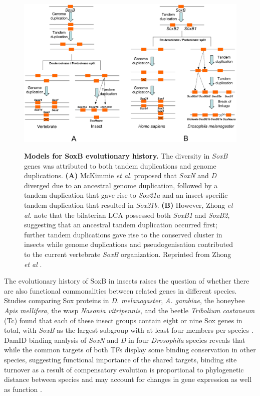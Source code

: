 \documentclass[withindex,glossary]{cam-thesis}
\begin{document}
\setcounter{figure}{3-1}
\begin{figure}[htb]
\centering
\includegraphics[width=\textwidth]{figs/Figure 3 Zhong vs McKimmie.png}
\label{fig3}
\caption{\textbf{Models for SoxB evolutionary history.} The diversity in \emph{SoxB} genes was attributed to both tandem duplications and genome duplications. \textbf{(A)} McKimmie \emph{et al.} \protect\citeyear{mckimmie_conserved_2005} proposed that \emph{SoxN} and \emph{D} diverged due to an ancestral genome duplication, followed by a tandem duplication that gave rise to \emph{Sox21a} and an insect-specific tandem duplication that resulted in \emph{Sox21b}. \textbf{(B)} However, Zhong \emph{et al.} note that the bilaterian LCA possessed both \emph{SoxB1} and \emph{SoxB2}, suggesting that an ancestral tandem duplication occurred first; further tandem duplications gave rise to the conserved cluster in insects while genome duplications and pseudogenisation contributed to the current vertebrate \emph{SoxB} organization. Reprinted from Zhong \emph{et al} \protect\citeyear{zhong_parallel_2011}.}
\end{figure}

The evolutionary history of SoxB in insects raises the question of
whether there are also functional commonalities between related genes in
different species. Studies comparing Sox proteins in \emph{D.
melanogaster}, \emph{A. gambiae}, the honeybee \emph{Apis mellifera},
the wasp \emph{Nasonia vitripennis}, and the beetle \emph{Tribolium
castaneum} (\gls{Tc}) found that each of these insect groups contain eight or
nine Sox genes in total, with \emph{SoxB} as the largest subgroup with
at least four members per species . DamID
binding analysis of \emph{SoxN} and \emph{D} in four \emph{Drosophila}
species reveals that while the common targets of both TFs display some
binding conservation in other species, suggesting functional importance
of the shared targets, binding site turnover as a result of compensatory
evolution is proportional to phylogenetic distance between species and
may account for changes in gene expression as well as function .
\end{document}
